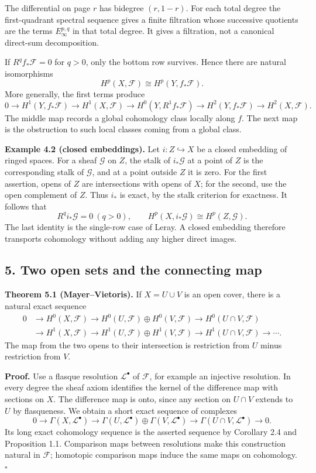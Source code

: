 \documentclass[11pt]{article}
\begin{document}
The differential on page \(r\) has bidegree \((r,1-r)\). For each total
degree the first-quadrant spectral sequence gives a finite filtration
whose successive quotients are the terms \(E_\infty^{p,q}\) in that
total degree. It gives a filtration, not a canonical direct-sum
decomposition.

If \(R^qf_*\mathcal F=0\) for \(q>0\), only the bottom row survives.
Hence there are natural isomorphisms \[
H^p(X,\mathcal F)\cong H^p(Y,f_*\mathcal F).
\] More generally, the first terms produce \[
0\to H^1(Y,f_*\mathcal F)\to H^1(X,\mathcal F)
\to H^0(Y,R^1f_*\mathcal F)\to H^2(Y,f_*\mathcal F)
\to H^2(X,\mathcal F).
\] The middle map records a global cohomology class locally along \(f\).
The next map is the obstruction to such local classes coming from a
global class.

\textbf{Example 4.2 (closed embeddings).} Let \(i:Z\hookrightarrow X\)
be a closed embedding of ringed spaces. For a sheaf \(\mathcal G\) on
\(Z\), the stalk of \(i_*\mathcal G\) at a point of \(Z\) is the
corresponding stalk of \(\mathcal G\), and at a point outside \(Z\) it
is zero. For the first assertion, opens of \(Z\) are intersections with
opens of \(X\); for the second, use the open complement of \(Z\). Thus
\(i_*\) is exact, by the stalk criterion for exactness. It follows that
\[
R^qi_*\mathcal G=0\ (q>0),\qquad
H^p(X,i_*\mathcal G)\cong H^p(Z,\mathcal G).
\] The last identity is the single-row case of Leray. A closed embedding
therefore transports cohomology without adding any higher direct images.

\subsection{5. Two open sets and the connecting
map}\label{two-open-sets-and-the-connecting-map}

\textbf{Theorem 5.1 (Mayer--Vietoris).} If \(X=U\cup V\) is an open
cover, there is a natural exact sequence \[
\begin{aligned}
0&\to H^0(X,\mathcal F)
\to H^0(U,\mathcal F)\oplus H^0(V,\mathcal F)
\to H^0(U\cap V,\mathcal F)\\
&\to H^1(X,\mathcal F)
\to H^1(U,\mathcal F)\oplus H^1(V,\mathcal F)
\to H^1(U\cap V,\mathcal F)\to\cdots.
\end{aligned}
\] The map from the two opens to their intersection is restriction from
\(U\) minus restriction from \(V\).

\textbf{Proof.} Use a flasque resolution \(\mathcal L^\bullet\) of
\(\mathcal F\), for example an injective resolution. In every degree the
sheaf axiom identifies the kernel of the difference map with sections on
\(X\). The difference map is onto, since any section on \(U\cap V\)
extends to \(U\) by flasqueness. We obtain a short exact sequence of
complexes \[
0\to\Gamma(X,\mathcal L^\bullet)
\to\Gamma(U,\mathcal L^\bullet)\oplus\Gamma(V,\mathcal L^\bullet)
\to\Gamma(U\cap V,\mathcal L^\bullet)\to0.
\] Its long exact cohomology sequence is the asserted sequence by
Corollary 2.4 and Proposition 1.1. Comparison maps between resolutions
make this construction natural in \(\mathcal F\); homotopic comparison
maps induce the same maps on cohomology. \(\square\)
\end{document}
